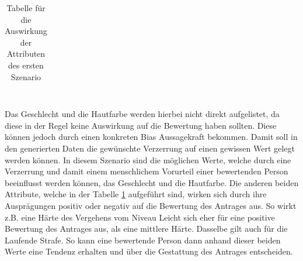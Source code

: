 \begin{onehalfspace}
\begin{table}[!h]
\begin{tabular}{|l|l|l|}
    \end{tabular}
\caption{Tabelle für die Auswirkung der Attributen des ersten Szenario}
\label{table:1}
\end{table}\\
Das Geschlecht und die Hautfarbe werden hierbei nicht direkt aufgelistet, da diese in der Regel keine Auswirkung auf die Bewertung haben sollten. Diese können jedoch durch einen konkreten Bias Aussagekraft bekommen. Damit soll in den generierten Daten die gewünschte Verzerrung auf einen gewissen Wert gelegt werden können. In diesem Szenario sind die möglichen Werte, welche durch eine Verzerrung und damit einem menschlichem Vorurteil einer bewertenden Person beeinflusst werden können, das Geschlecht und die Hautfarbe. Die anderen beiden Attribute, welche in der Tabelle \ref*{table:1} aufgeführt sind, wirken sich durch ihre Ausprägungen positiv oder negativ auf die Bewertung des Antrages aus. So wirkt z.B. eine Härte des Vergehens vom Niveau Leicht sich eher für eine positive Bewertung des Antrages aus, als eine mittlere Härte. Dasselbe gilt auch für die Laufende Strafe. So kann eine bewertende Person dann anhand dieser beiden Werte eine Tendenz erhalten und über die Gestattung des Antrages entscheiden.

\end{onehalfspace}
